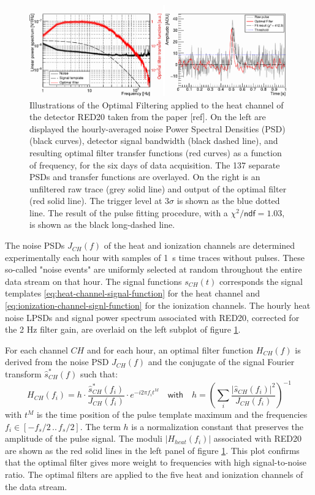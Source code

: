 \begin{figure}
\centering
\includegraphics[scale=1]{Figures/ElectrodesExperimental/of_illustration.pdf}
\caption{Illustrations of the Optimal Filtering applied to the heat channel of the detector RED20 taken from the paper [ref]. On the left are displayed the hourly-averaged noise Power Spectral Densities (PSD) (black curves), detector signal bandwidth (black dashed line), and resulting optimal filter transfer functions (red
curves) as a function of frequency, for the six days of data acquisition. The 137 separate PSDs
and transfer functions are overlayed. On the right is an unfiltered raw trace
(grey solid line) and output of the optimal filter (red solid line). The trigger level at $3\sigma$ is shown
as the blue dotted line. The result of the pulse fitting procedure, with a $\chi^2/\textsf{ndf} = 1.03$, is shown
as the black long-dashed line.}
\label{fig:optimal-filtering}
\end{figure}

The noise PSDs $J_{CH}(f)$ of the heat and ionization channels are determined experimentally each hour with samples of \SI{1}{\s} time traces without pulses. These so-called "noise events" are uniformly selected at random throughout the entire data stream on that hour. The signal functions $s_{CH}(t)$ corresponds the signal templates \ref{eq:heat-channel-signal-function} for the heat channel and \ref{eq:ionization-channel-signl-function} for the ionization channels. The hourly heat noise LPSDs and signal power spectrum associated with RED20, corrected for the 2 Hz filter gain, are overlaid on the left subplot of figure \ref{fig:optimal-filtering}.

For each channel $CH$ and for each hour, an optimal filter function $H_{CH}(f)$ is derived from the noise PSD $J_{CH}(f)$ and the conjugate of the signal Fourier transform $\hat{s}^*_{CH}(f)$ such that:
\begin{equation}
\label{eq:optimal-filter}
H_{CH}(f_i) = 
h \cdot \frac{\hat{s}_{CH}^*(f_i)}{J_{CH}(f_i)}
\cdot e^{-i 2 \pi f_i t^M}
\quad \textsf{with} \quad
h =
\left( \sum_i
\frac{|\hat{s}_{CH}(f_i)|^2}{J_{CH}(f_i)}
 \right)^{-1}
\end{equation}
with $t^M$ is the time position of the pulse template maximum and the frequencies $f_i \in [-f_s/2\, .. \,f_s/2]$. The term $h$ is a normalization constant that preserves the amplitude of the pulse signal. The moduli $|H_{heat}(f_i)|$ associated with RED20 are shown as the red solid lines in the left panel of figure \ref{fig:optimal-filtering}. This plot confirms that the optimal filter gives more weight to frequencies with high signal-to-noise ratio. The optimal filters are applied to the five heat and ionization channels of the data stream.

